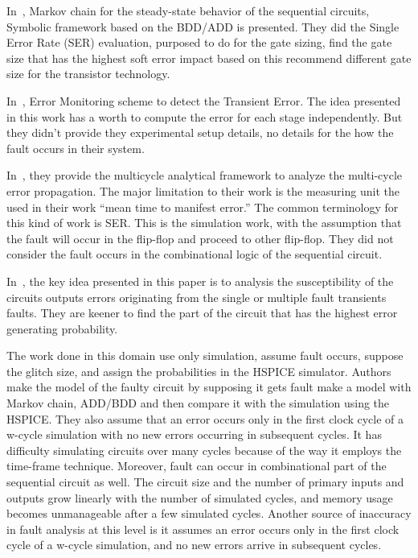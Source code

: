 In~\cite{miskov2008modeling}, Markov chain for the steady-state behavior of the sequential circuits, Symbolic framework
based on the BDD/ADD is presented. They did the Single Error Rate (SER) evaluation, purposed to do
for the gate sizing, find the gate size that has the highest soft error impact based on this recommend
different gate size for the transistor technology. 
 




In~\cite{das2007monitoring}, Error Monitoring scheme to detect the Transient Error. The idea presented in this work has a worth to compute the error for each stage
independently. But they didn't provide they experimental setup details, no details for the how the fault
occurs in their system.

In~\cite{asadi2005soft}, they provide the multicycle analytical framework to analyze the multi-cycle error
propagation. The major limitation to their work is the measuring unit the used in their work “mean time
to manifest error.” The common terminology for this kind of work is SER. This is the simulation work,
with the assumption that the fault will occur in the flip-flop and proceed to other flip-flop. They did not
consider the fault occurs in the combinational logic of the sequential circuit.

In~\cite{miskov2010multiple}, the key idea presented in this paper is to analysis the susceptibility of the circuits outputs
errors originating from the single or multiple fault transients faults. They are keener to find the part of
the circuit that has the highest error generating probability.





The work done in this domain use only simulation, assume fault occurs, suppose the glitch size, and assign the
probabilities in the HSPICE simulator. Authors make the model of the faulty circuit by supposing it gets
fault make a model with Markov chain, ADD/BDD and then compare it with the simulation using the
HSPICE. They also assume that an error occurs only in the first clock cycle of a w-cycle simulation with
no new errors occurring in subsequent cycles. It has difficulty simulating circuits over many cycles
because of the way it employs the time-frame technique. Moreover, fault can occur in combinational part of the sequential circuit as well. The circuit size and the number of primary
inputs and outputs grow linearly with the number of simulated cycles, and memory usage becomes
unmanageable after a few simulated cycles. Another source of inaccuracy in fault analysis at this level is it
assumes an error occurs only in the first clock cycle of a w-cycle simulation, and no new errors arrive in
subsequent cycles.












